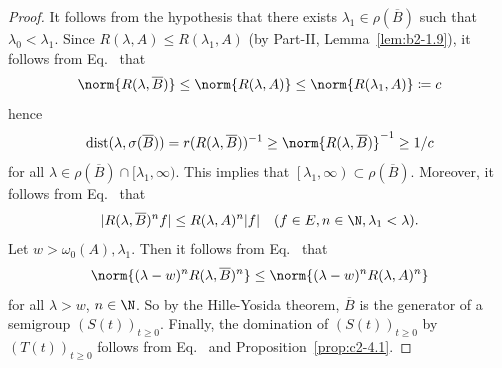 \begin{proof}
It follows from the hypothesis that there exists $\lambda_{1} \in \rho(\overline{B})$ such that $\lambda_{0} < \lambda_{1}$. 
Since $R(\lambda,A) \leq R(\lambda_{1},A)$ (by Part-II, Lemma~\ref{lem:b2-1.9}), it follows from Eq.~ that 
%
\[
	\norm{R(\lambda,\overline{B})} \leq \norm{R(\lambda,A)} \leq \norm{R(\lambda_{1},A)} \coloneq c  
\]
%
hence 
%
\[
	\text{dist}(\lambda,\sigma(\overline{B})) = r(R(\lambda,\overline{B}))^{-1} \geq \norm{R(\lambda,\overline{B})}^{-1} \geq 1/c 
\]
%
for all $\lambda \in \rho(\overline{B}) \cap [\lambda_{1},\infty)$. 
This implies that $\left[\lambda_{1},\infty\right) \subset \rho(\overline{B})$. Moreover, it follows from Eq.~ that
\begin{equation}\label{eq:c2-4.9}
|R(\lambda,\overline{B})^{n}f| \leq R(\lambda,A)^{n}|f| \quad (f \in E, n \in \N , \lambda_{1} < \lambda).
\end{equation}
Let $w > \omega_{0}(A), \lambda_{1}$. 
Then it follows from Eq.~ that 
%
\[
	\norm{(\lambda - w)^{n}R(\lambda,\overline{B})^{n}} \leq \norm{(\lambda - w)^{n}R(\lambda,A)^{n}} 
\]
%
for all $\lambda > w$, $n \in \N $. 
So by the Hille-Yosida theorem, $\overline{B}$ is the generator of a semigroup $(S(t))_{t \geq 0}$. 
Finally, the domination of\/ $(S(t))_{t \geq 0}$ by $(T(t))_{t \geq 0}$ follows from Eq.~ and  Proposition~\ref{prop:c2-4.1}.
\end{proof}

